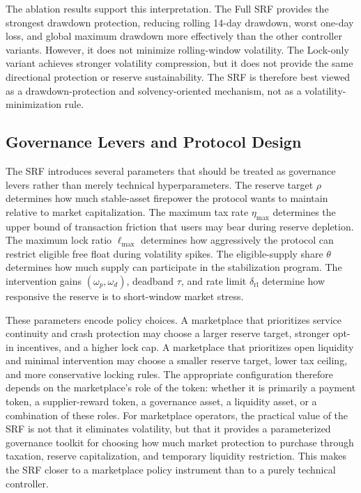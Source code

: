 \documentclass[a4paper,fleqn]{cas-dc}
\begin{document}
The ablation results support this interpretation. The Full SRF provides the strongest drawdown protection, reducing rolling 14-day drawdown, worst one-day loss, and global maximum drawdown more effectively than the other controller variants. However, it does not minimize rolling-window volatility. The Lock-only variant achieves stronger volatility compression, but it does not provide the same directional protection or reserve sustainability. The SRF is therefore best viewed as a drawdown-protection and solvency-oriented mechanism, not as a volatility-minimization rule.

\subsection{Governance Levers and Protocol Design}
\label{subsec:discussion_governance_levers}

The SRF introduces several parameters that should be treated as governance levers rather than merely technical hyperparameters. The reserve target \(\rho\) determines how much stable-asset firepower the protocol wants to maintain relative to market capitalization. The maximum tax rate \(\eta_{\max}\) determines the upper bound of transaction friction that users may bear during reserve depletion. The maximum lock ratio \(\ell_{\max}\) determines how aggressively the protocol can restrict eligible free float during volatility spikes. The eligible-supply share \(\theta\) determines how much supply can participate in the stabilization program. The intervention gains \((\omega_p,\omega_d)\), deadband \(\tau\), and rate limit \(\delta_{\mathrm{rl}}\) determine how responsive the reserve is to short-window market stress.

These parameters encode policy choices. A marketplace that prioritizes service continuity and crash protection may choose a larger reserve target, stronger opt-in incentives, and a higher lock cap. A marketplace that prioritizes open liquidity and minimal intervention may choose a smaller reserve target, lower tax ceiling, and more conservative locking rules. The appropriate configuration therefore depends on the marketplace's role of the token: whether it is primarily a payment token, a supplier-reward token, a governance asset, a liquidity asset, or a combination of these roles. For marketplace operators, the practical value of the SRF is not that it eliminates volatility, but that it provides a parameterized governance toolkit for choosing how much market protection to purchase through taxation, reserve capitalization, and temporary liquidity restriction. This makes the SRF closer to a marketplace policy instrument than to a purely technical controller.
\end{document}
